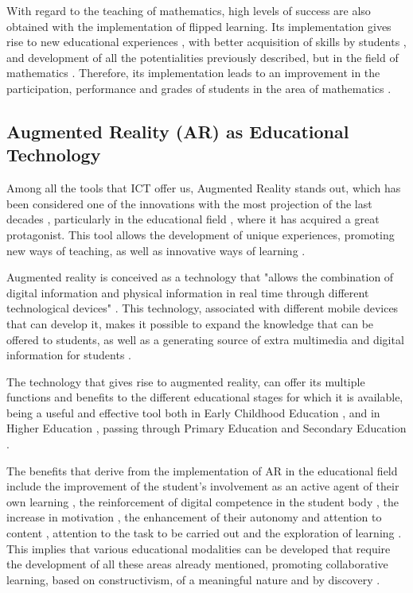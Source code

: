 \documentclass{textolivre}
\begin{document}
With regard to the teaching of mathematics, high levels of success are also obtained with the implementation of flipped learning. Its implementation gives rise to new educational experiences \cite{hodges2011}, with better acquisition of skills by students \cite{cruz2012}, and development of all the potentialities previously described, but in the field of mathematics \cite{dearaujo2017, bishop2013}. Therefore, its implementation leads to an improvement in the participation, performance and grades of students in the area of mathematics \cite{adams2018, amstelveen2019, sun2018}.

\subsection{Augmented Reality (AR) as Educational Technology}
Among all the tools that ICT offer us, Augmented Reality stands out, which has been considered one of the innovations with the most projection of the last decades \cite{lorenzo2018}, 
particularly in the educational field \cite{cabero2019},
where it has acquired a great protagonist. This tool allows the development of unique experiences, promoting new ways of teaching, as well as innovative ways of learning \cite{cheng2017}.  

Augmented reality is conceived as a technology that "allows the combination of digital information and physical information in real time through different technological devices" \cite{barroso2017}. This technology, associated with different mobile devices that can develop it, makes it possible to expand the knowledge that can be offered to students, as well as a generating source of extra multimedia and digital information for students \cite{gomez2018}.

The technology that gives rise to augmented reality, can offer its multiple functions and benefits to the different educational stages for which it is available, being a useful and effective tool both in Early Childhood Education \cite{lopezbelmonte+pozosanchez+lopezbelmonte2019}, and in Higher Education \cite{garay2017}, passing through Primary Education \cite{lopezbelmonte+pozosanchez+fuentescabrera+romero2020} and Secondary Education \cite{morenoguerrero+romerorodriguez+lopezbelmonte+alonsogarcia2020}.  

The benefits that derive from the implementation of AR in the educational field include the improvement of the student's involvement as an active agent of their own learning \cite{caberollorentegutierrez2017}, the reinforcement of digital competence in the student body \cite{toledo2017}, the increase in motivation \cite{bacca2014}, the enhancement of their autonomy and attention to content \cite{marincabero2018}, attention to the task to be carried out \cite{cheng2017} and the exploration of learning \cite{fombonavazquez2017}. This implies that various educational modalities can be developed that require the development of all these areas already mentioned, promoting collaborative learning, based on constructivism, of a meaningful nature and by discovery \cite{caberollorentemarin2017}. 
\end{document}
